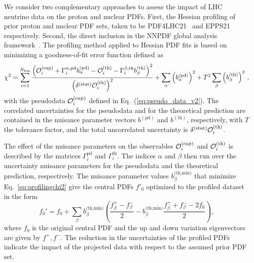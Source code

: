 We consider two complementary approaches to assess the
impact of LHC neutrino data on the proton and nuclear PDFs.
%
First, the Hessian profiling\cite{Paukkunen:2014zia, Schmidt:2018hvu, AbdulKhalek:2018rok, HERAFitterdevelopersTeam:2015cre} of prior proton and
nuclear PDF sets, taken to be PDF4LHC21~\cite{PDF4LHCWorkingGroup:2022cjn} and
EPPS21~\cite{Eskola:2021nhw} respectively.
%
Second, the direct inclusion 
in the NNPDF global analysis framework~\cite{NNPDF:2021uiq,NNPDF:2021njg}.
%
The profiling method applied to Hessian PDF fits is based
on minimizing a goodness-of-fit error function defined as
\begin{equation}
\chi^2 = 
\sum_{i=1}^{N_{\textrm{bin}}} 
{{\left(  \mathcal{O}_i^{\rm (exp)}
            + \Gamma_i^{\alpha,\textrm{pd}}
              b_\alpha^{\textrm{(pd)}}
            - \mathcal{O}_i^{\rm (th)}
            - \Gamma_i^{\beta,\textrm{th}}
              b_\beta^{(\textrm{th})}
     \right)^2
     }\over { \left(\delta^{{\rm (stat)}}\mathcal{O}_i^{\rm (th)}\right)^2 }}
+ \sum_\alpha \left( b_\alpha^{(\textrm{pd})}\right)^2
+ T^2 \sum_\beta  \left( b_\beta^{\textrm{(th)}}\right) ^2 \, ,
\label{eq:profilingchi2}
\end{equation}
with the pseudodata 
$\mathcal{O}_i^{\rm (exp)}$ defined in  Eq.~(\ref{eq:pseudo_data_v2}).
%
The correlated uncertainties for the pseudodata and for the theoretical prediction 
are contained in the nuisance parameter vectors $b^{(\textrm{pd})}$ and $b^{(\textrm{th})}$, respectively, with $T$ the tolerance factor, and the total uncorrelated uncertainty is $\delta^{{\rm (stat)}}\mathcal{O}_i^{\rm (th)}$.

The effect of the nuisance parameters
on the observables $\mathcal{O}_i^{\rm (exp)}$ and $\mathcal{O}_i^{\rm (th)}$
is described by the matrices $\Gamma_i^{\textrm{pd}}$ and $\Gamma_i^{\textrm{th}}$.
%
The indices $\alpha$ and $\beta$ then run over the uncertainty nuisance parameters for the pseudodata and the theoretical prediction, respectively.
%
The nuisance parameter values $b_\beta^{\textrm{(th,min)}}$ that minimize Eq.~\eqref{eq:profilingchi2} give the central PDFs $f'_0$ optimized to the profiled dataset in the form
\begin{equation}
f_0' = f_0
      + \sum_\beta b_\beta^{\textrm{(th,min)}} 
        \left(  \frac{f_\beta^+   -  f_\beta^- }{2}
              -    b_\beta^{\textrm{(th,min)}}
                \frac{f_\beta^+ + f_\beta^- - 2f_0}{2}
        \right),
\end{equation}
where $f_0$ is the original central PDF and the up and down variation eigenvectors are given by $f^+, f^-$.
%
The reduction in the uncertainties of the profiled PDFs indicate the impact
of the projected data with respect to the assumed prior PDF set.

